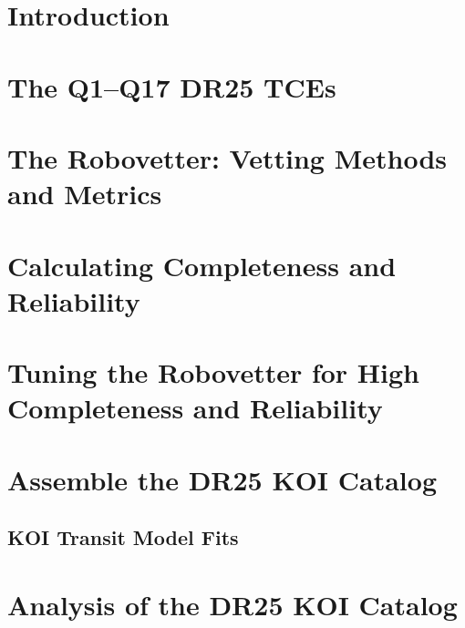 \documentclass[apj,twocolappendix,numberedappendix]{emulateapj}
\renewcommand{\_}{\discretionary{\underscore}{}{\underscore}}  %
\begin{document}

\section{Introduction}



\section{The Q1--Q17 DR25 TCEs}
\label{tcesec}





\section{The Robovetter: Vetting Methods and Metrics}


\section{Calculating Completeness and Reliability}


\section{Tuning the Robovetter for High Completeness and Reliability}



\section{Assemble the DR25 KOI Catalog}


\subsection{KOI Transit Model Fits}




\section{Analysis of the DR25 KOI Catalog}
\end{document}
